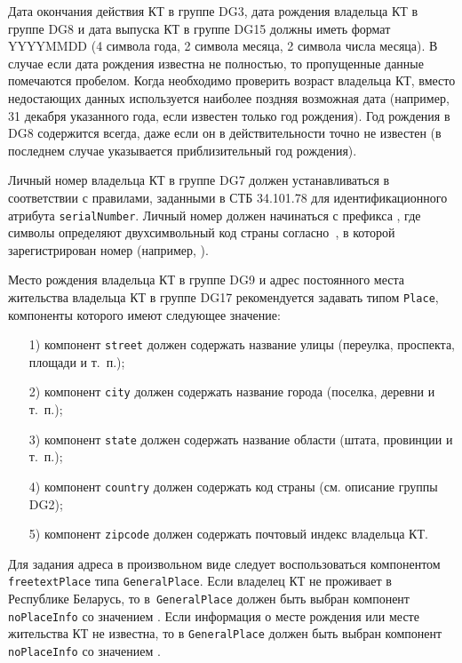 Дата окончания действия КТ в группе DG3, дата рождения владельца КТ в группе DG8 
и дата выпуска КТ в группе DG15 должны иметь формат YYYYMMDD 
(4 символа года, 2 символа месяца, 2 символа 
числа месяца). В случае если дата рождения известна не полностью, то 
пропущенные данные помечаются пробелом. Когда необходимо проверить 
возраст владельца КТ, вместо недостающих данных используется наиболее 
поздняя возможная дата (например, 31 декабря указанного года, если 
известен только год рождения). Год рождения в DG8 содержится всегда, даже 
если он в действительности точно не известен (в последнем случае 
указывается приблизительный год рождения). 

Личный номер владельца КТ в группе DG7 должен устанавливаться в соответствии с
правилами, заданными в СТБ 34.101.78 для идентификационного атрибута
\verb|serialNumber|. Личный номер должен начинаться с префикса
, где символы  определяют двухсимвольный код страны
согласно~\cite{CountryCodes}, в которой зарегистрирован номер
(например, ).

Место рождения владельца КТ в группе DG9 и адрес постоянного места жительства
владельца КТ в группе DG17 рекомендуется задавать типом \verb|Place|, 
компоненты которого имеют следующее значение: 
\begin{enumerate}
\item[1)]
компонент \verb|street| должен содержать название улицы (переулка, 
проспекта, площади и т.~п.); 
\item[2)]
компонент \verb|city| должен содержать название города (поселка, деревни и т.~п.); 
\item[3)]
компонент \verb|state| должен содержать название области (штата, провинции и т.~п.);
\item[4)]
компонент \verb|country| должен содержать код страны (см. описание группы DG2);
\item[5)]
компонент \verb|zipcode| должен содержать почтовый индекс владельца КТ.
\end{enumerate}

Для задания адреса в произвольном виде следует воспользоваться компонентом 
\verb|freetextPlace| типа \verb|GeneralPlace|. Если владелец КТ не проживает в 
Республике Беларусь, то в~\verb|GeneralPlace| должен быть выбран компонент 
\verb|noPlaceInfo| со значением . 
Если информация о месте рождения или месте жительства 
КТ не известна, то в \verb|GeneralPlace| 
должен быть выбран компонент \verb|noPlaceInfo| со значением 
. 

